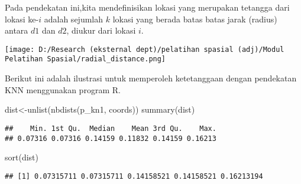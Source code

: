\documentclass[
]{book}
\newenvironment{Shaded}{\begin{snugshade}}{\end{snugshade}}
\newcommand{\FunctionTok}[1]{\textcolor[rgb]{0.00,0.00,0.00}{#1}}
\newcommand{\NormalTok}[1]{#1}
\newcommand{\OtherTok}[1]{\textcolor[rgb]{0.56,0.35,0.01}{#1}}
\begin{document}
Pada pendekatan ini,kita mendefinisikan lokasi yang merupakan tetangga dari lokasi ke-\(i\) adalah sejumlah \(k\) lokasi yang berada batas batas jarak (radius) antara \(d1\) dan \(d2\), diukur dari lokasi \(i\).

\texttt{[image: D:/Research (eksternal dept)/pelatihan spasial (adj)/Modul Pelatihan Spasial/radial\_distance.png]}

Berikut ini adalah ilustrasi untuk memperoleh ketetanggaan dengan pendekatan KNN menggunakan program R.

\begin{Shaded}
\begin{Highlighting}[]
\NormalTok{dist}\OtherTok{\textless{}{-}}\FunctionTok{unlist}\NormalTok{(}\FunctionTok{nbdists}\NormalTok{(p\_kn1, coords))}
\FunctionTok{summary}\NormalTok{(dist)}
\end{Highlighting}
\end{Shaded}

\begin{verbatim}
##    Min. 1st Qu.  Median    Mean 3rd Qu.    Max. 
## 0.07316 0.07316 0.14159 0.11832 0.14159 0.16213
\end{verbatim}

\begin{Shaded}
\begin{Highlighting}[]
\FunctionTok{sort}\NormalTok{(dist)}
\end{Highlighting}
\end{Shaded}

\begin{verbatim}
## [1] 0.07315711 0.07315711 0.14158521 0.14158521 0.16213194
\end{verbatim}
\end{document}
